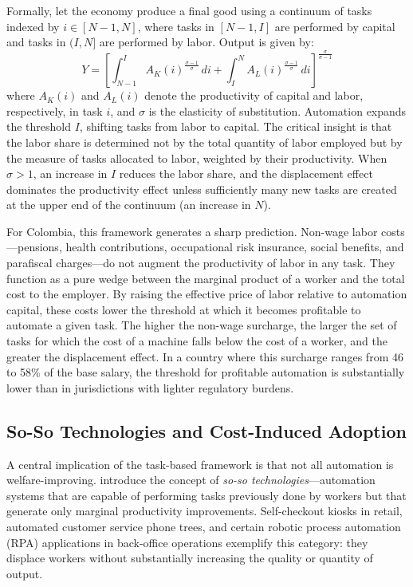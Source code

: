 \documentclass{article}
\begin{document}
Formally, let the economy produce a final good using a continuum of tasks indexed by $i \in [N-1, N]$, where tasks in $[N-1, I]$ are performed by capital and tasks in $(I, N]$ are performed by labor. Output is given by:
\begin{equation}
Y = \left[\int_{N-1}^{I} A_K(i)^{\frac{\sigma-1}{\sigma}} \, di + \int_{I}^{N} A_L(i)^{\frac{\sigma-1}{\sigma}} \, di \right]^{\frac{\sigma}{\sigma-1}}
\label{eq:task_production}
\end{equation}
where $A_K(i)$ and $A_L(i)$ denote the productivity of capital and labor, respectively, in task $i$, and $\sigma$ is the elasticity of substitution. Automation expands the threshold $I$, shifting tasks from labor to capital. The critical insight is that the labor share is determined not by the total quantity of labor employed but by the measure of tasks allocated to labor, weighted by their productivity. When $\sigma > 1$, an increase in $I$ reduces the labor share, and the displacement effect dominates the productivity effect unless sufficiently many new tasks are created at the upper end of the continuum (an increase in $N$).

For Colombia, this framework generates a sharp prediction. Non-wage labor costs---pensions, health contributions, occupational risk insurance, social benefits, and parafiscal charges---do not augment the productivity of labor in any task. They function as a pure wedge between the marginal product of a worker and the total cost to the employer. By raising the effective price of labor relative to automation capital, these costs lower the threshold at which it becomes profitable to automate a given task. The higher the non-wage surcharge, the larger the set of tasks for which the cost of a machine falls below the cost of a worker, and the greater the displacement effect. In a country where this surcharge ranges from 46 to 58\% of the base salary, the threshold for profitable automation is substantially lower than in jurisdictions with lighter regulatory burdens.

\subsection{So-So Technologies and Cost-Induced Adoption}
\label{subsec:soso}

A central implication of the task-based framework is that not all automation is welfare-improving. \cite{acemoglu2019automation} introduce the concept of \textit{so-so technologies}---automation systems that are capable of performing tasks previously done by workers but that generate only marginal productivity improvements. Self-checkout kiosks in retail, automated customer service phone trees, and certain robotic process automation (RPA) applications in back-office operations exemplify this category: they displace workers without substantially increasing the quality or quantity of output.
\end{document}
